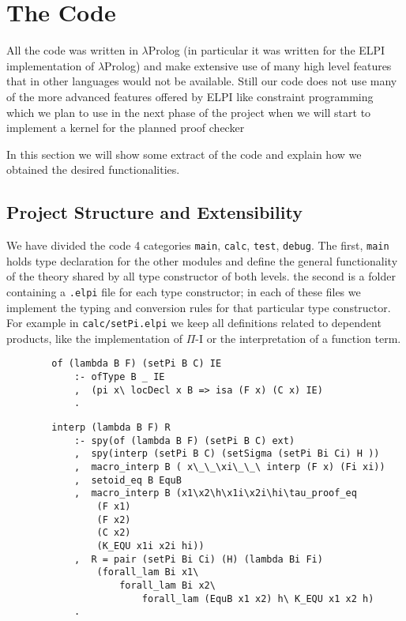 
\section{The Code}
	All the code was written in $\lambda$Prolog (in particular it was written for the ELPI implementation \cite{dunchev2015elpi} of $\lambda$Prolog) and make extensive use of many high level features that in other languages would not be available. Still our code does not use many of the more advanced features offered by ELPI like constraint programming which we plan to use in the next phase of the project when we will start to implement a kernel for the planned proof checker

	In this section we will show some extract of the code and explain how we obtained the desired functionalities.
	\subsection{Project Structure and Extensibility}
		We have divided the code 4 categories \verb|main|, \verb|calc|, \verb|test|, \verb|debug|.
		The first, \verb|main| holds type declaration for the other modules and define the general functionality of the theory shared by all type constructor of both levels.
		the second is a folder containing a \verb|.elpi| file for each type constructor; in each of these files we implement the typing and conversion rules for that particular type constructor. For example in \verb|calc/setPi.elpi| we keep all definitions related to dependent products, like the implementation of $\Pi$-I or the interpretation of a function term.
		\begin{verbatim}
		of (lambda B F) (setPi B C) IE
		    :- ofType B _ IE
		    ,  (pi x\ locDecl x B => isa (F x) (C x) IE)
		    .		
		\end{verbatim}

		\begin{verbatim}
		interp (lambda B F) R
		    :- spy(of (lambda B F) (setPi B C) ext)
		    ,  spy(interp (setPi B C) (setSigma (setPi Bi Ci) H ))
		    ,  macro_interp B ( x\_\_\xi\_\_\ interp (F x) (Fi xi))
		    ,  setoid_eq B EquB
		    ,  macro_interp B (x1\x2\h\x1i\x2i\hi\tau_proof_eq 
		        (F x1) 
		        (F x2) 
		        (C x2) 
		        (K_EQU x1i x2i hi))
		    ,  R = pair (setPi Bi Ci) (H) (lambda Bi Fi)
		        (forall_lam Bi x1\ 
		        	forall_lam Bi x2\ 
		        	    forall_lam (EquB x1 x2) h\ K_EQU x1 x2 h)
		    .
		\end{verbatim}
		

